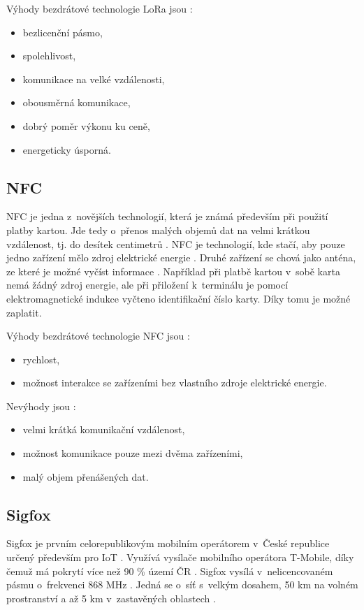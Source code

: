 Výhody bezdrátové technologie LoRa jsou \cite{LoRa_IoT_PORT}:
\begin{itemize}
  \item bezlicenční pásmo,
  \item spolehlivost,
  \item komunikace na velké vzdálenosti,
  \item obousměrná komunikace,
  \item dobrý poměr výkonu ku ceně,
  \item energeticky úsporná.
\end{itemize}

\subsection{NFC}
NFC je jedna z~novějších technologií, která je známá především při použití platby kartou. Jde tedy o~přenos malých objemů dat na velmi krátkou 
vzdálenost, tj. do desítek centimetrů \cite{Bezdrat_muni}. NFC je technologií, kde stačí, aby pouze jedno zařízení mělo zdroj elektrické 
energie \cite{Bezdrat_muni}. Druhé zařízení se chová jako anténa, ze které je možné vyčíst informace \cite{Bezdrat_muni}. Například při 
platbě kartou v~sobě karta nemá žádný zdroj energie, ale při přiložení k~terminálu je pomocí elektromagnetické indukce vyčteno identifikační
číslo karty. Díky tomu je možné zaplatit. 

Výhody bezdrátové technologie NFC jsou \cite{Bezdrat_muni}:
\begin{itemize}
  \item rychlost,
  \item možnost interakce se zařízeními bez vlastního zdroje elektrické energie.
\end{itemize}

Nevýhody jsou \cite{Bezdrat_muni}:
\begin{itemize}
  \item velmi krátká komunikační vzdálenost,
  \item možnost komunikace pouze mezi dvěma zařízeními, 
  \item malý objem přenášených dat.
\end{itemize}

\subsection{Sigfox}
Sigfox je prvním celorepublikovým mobilním operátorem v~České republice určený především pro IoT \cite{Sigfox_cz}. Využívá vysílače mobilního operátora T-Mobile, 
díky čemuž má pokrytí více než 90 \% území ČR \cite{Sigfox_Zooco}. Sigfox vysílá v~nelicencovaném pásmu o~frekvenci 868 MHz \cite{Sigfox_cz}. Jedná se o~síť 
s~velkým dosahem, 50 km na volném prostranství a až 5 km v~zastavěných oblastech \cite{Sigfox_Zooco}.  

